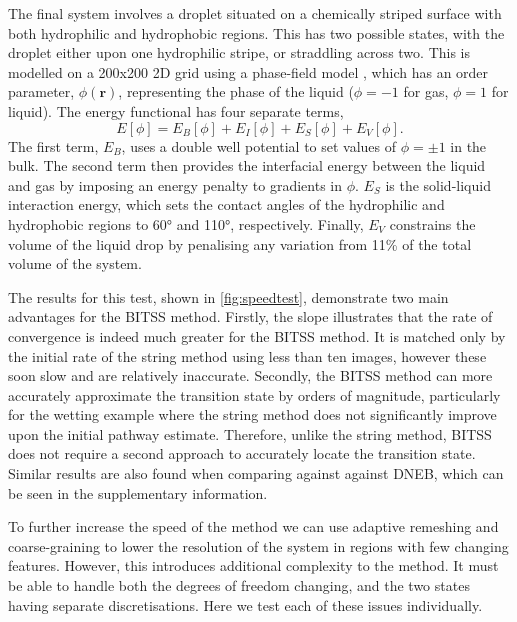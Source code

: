 \documentclass[aps,prl,twocolumn,groupedaddress]{revtex4}
\begin{document}
\topic The final system involves a droplet situated on a chemically striped surface with both hydrophilic and hydrophobic regions.
This has two possible states, with the droplet either upon one hydrophilic stripe, or straddling across two.
This is modelled on a 200x200 2D grid using a phase-field model \cite{Panter2019b}, which has an order parameter, $\phi(\bm{r})$, representing the phase of the liquid ($\phi=-1$ for gas, $\phi=1$ for liquid).
The energy functional has four separate terms,
\begin{equation} \label{eq:phasefield}
  E[\phi] = E_B[\phi] + E_I[\phi] + E_S[\phi] + E_V[\phi].
\end{equation}
The first term, $E_B$, uses a double well potential to set values of $\phi=\pm1$ in the bulk.
The second term then provides the interfacial energy between the liquid and gas by imposing an energy penalty to gradients in $\phi$.
$E_S$ is the solid-liquid interaction energy, which sets the contact angles of the hydrophilic and hydrophobic regions to 60\si{\degree} and 110\si{\degree}, respectively.
Finally, $E_V$ constrains the volume of the liquid drop by penalising any variation from 11\% of the total volume of the system.

\topic The results for this test, shown in \cref{fig:speedtest}, demonstrate two main advantages for the BITSS method.
Firstly, the slope illustrates that the rate of convergence is indeed much greater for the BITSS method.
It is matched only by the initial rate of the string method using less than ten images, however these soon slow and are relatively inaccurate.
Secondly, the BITSS method can more accurately approximate the transition state by orders of magnitude, particularly for the wetting example where the string method does not significantly improve upon the initial pathway estimate.
Therefore, unlike the string method, BITSS does not require a second approach to accurately locate the transition state.
Similar results are also found when comparing against against DNEB, which can be seen in the supplementary information.


\topic To further increase the speed of the method we can use adaptive remeshing and coarse-graining to lower the resolution of the system in regions with few changing features.
However, this introduces additional complexity to the method.
It must be able to handle both the degrees of freedom changing, and the two states having separate discretisations.
Here we test each of these issues individually.
\end{document}
